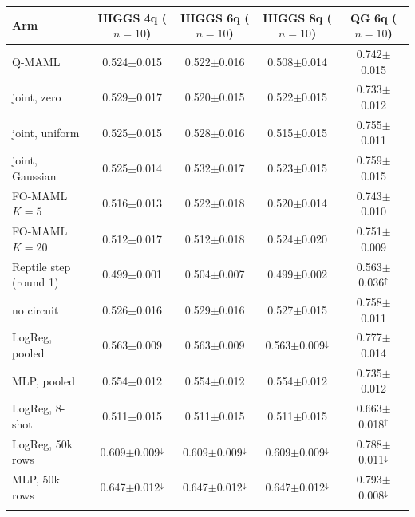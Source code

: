 \begin{tabular}{@{}lcccc@{}}
\toprule
Arm & HIGGS 4q ($n{=}10$) & HIGGS 6q ($n{=}10$) & HIGGS 8q ($n{=}10$) & QG 6q ($n{=}10$) \\
\midrule
Q-MAML & 0.524$\pm$0.015 & 0.522$\pm$0.016 & 0.508$\pm$0.014 & 0.742$\pm$0.015 \\
joint, zero & 0.529$\pm$0.017 & 0.520$\pm$0.015 & 0.522$\pm$0.015 & 0.733$\pm$0.012 \\
joint, uniform & 0.525$\pm$0.015 & 0.528$\pm$0.016 & 0.515$\pm$0.015 & 0.755$\pm$0.011 \\
joint, Gaussian & 0.525$\pm$0.014 & 0.532$\pm$0.017 & 0.523$\pm$0.015 & 0.759$\pm$0.015 \\
FO-MAML $K{=}5$ & 0.516$\pm$0.013 & 0.522$\pm$0.018 & 0.520$\pm$0.014 & 0.743$\pm$0.010 \\
FO-MAML $K{=}20$ & 0.512$\pm$0.017 & 0.512$\pm$0.018 & 0.524$\pm$0.020 & 0.751$\pm$0.009 \\
Reptile step (round 1) & 0.499$\pm$0.001 & 0.504$\pm$0.007 & 0.499$\pm$0.002 & 0.563$\pm$0.036$^{\uparrow}$ \\
no circuit & 0.526$\pm$0.016 & 0.529$\pm$0.016 & 0.527$\pm$0.015 & 0.758$\pm$0.011 \\
LogReg, pooled & 0.563$\pm$0.009 & 0.563$\pm$0.009 & 0.563$\pm$0.009$^{\downarrow}$ & 0.777$\pm$0.014 \\
MLP, pooled & 0.554$\pm$0.012 & 0.554$\pm$0.012 & 0.554$\pm$0.012 & 0.735$\pm$0.012 \\
LogReg, 8-shot & 0.511$\pm$0.015 & 0.511$\pm$0.015 & 0.511$\pm$0.015 & 0.663$\pm$0.018$^{\uparrow}$ \\
LogReg, 50k rows & 0.609$\pm$0.009$^{\downarrow}$ & 0.609$\pm$0.009$^{\downarrow}$ & 0.609$\pm$0.009$^{\downarrow}$ & 0.788$\pm$0.011$^{\downarrow}$ \\
MLP, 50k rows & 0.647$\pm$0.012$^{\downarrow}$ & 0.647$\pm$0.012$^{\downarrow}$ & 0.647$\pm$0.012$^{\downarrow}$ & 0.793$\pm$0.008$^{\downarrow}$ \\
\botrule
\end{tabular}
